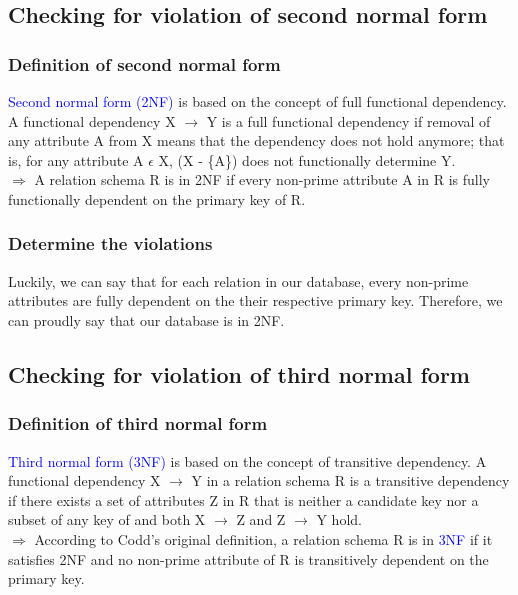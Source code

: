 \documentclass[a4paper]{article}
\numberwithin{equation}{section}
\begin{document}
\subsection{Checking for violation of second normal form}
\subsubsection{Definition of second normal form }
\textcolor{blue}{Second normal form (2NF)} is based on the concept of full functional dependency.
A functional dependency X \(\rightarrow \) Y is a full functional dependency if removal of any attribute A from X means that the dependency does not hold anymore; that is, for any attribute A \(\epsilon \) X, (X - \{A\}) does not functionally determine Y. \\
\(\Rightarrow \) A relation schema R is in 2NF if every non-prime attribute A in R is
fully functionally dependent on the primary key of R.

\subsubsection{Determine the violations}
Luckily, we can say that for each relation in our database, every non-prime attributes are fully dependent on the their respective primary key. Therefore, we can proudly say that our database is in 2NF\@.


\subsection{Checking for violation of third normal form}
\subsubsection{Definition of third normal form}
\textcolor{blue}{Third normal form (3NF)} is based on the concept of transitive dependency. A functional dependency X \(\rightarrow \) Y in a relation schema R is a transitive dependency if there exists a set of attributes Z in R that is neither a candidate key nor a subset of any key of  and both X \(\rightarrow \) Z and Z \(\rightarrow \) Y hold. \\
\(\Rightarrow \) According to Codd’s original definition, a relation schema R is in
\textcolor{blue}{3NF} if it satisfies 2NF and no non-prime attribute of R is transitively dependent on the primary key.
\end{document}
